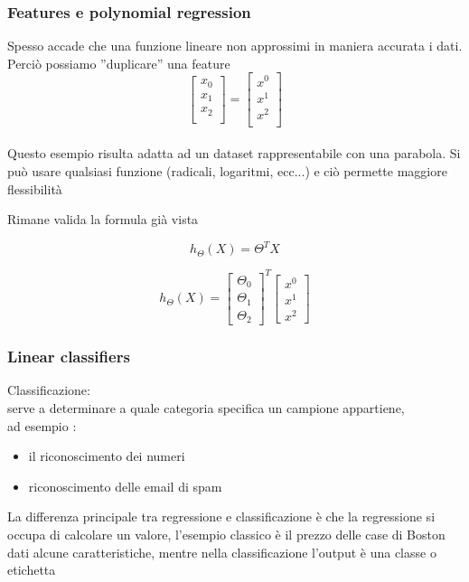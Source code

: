 \documentclass[10pt,oneside,a4paper]{article}
\begin{document}
\fi

\subsubsection{Features e polynomial regression}
Spesso accade che una funzione lineare non approssimi in maniera accurata i dati.
Perciò possiamo ''duplicare'' una feature \\
\[
\begin{bmatrix}
x_{0} \\
x_{1}  \\
x_{2} \\
\end{bmatrix}
=
\begin{bmatrix}
x^{0} \\
x^{1} \\
x^{2} \\
\end{bmatrix}
\] \\
Questo esempio risulta adatta ad un dataset rappresentabile con una parabola.
Si può usare qualsiasi funzione (radicali, logaritmi, ecc...) e ciò permette maggiore flessibilità

Rimane valida la formula già vista

$$h_{\Theta}(X)=\Theta^{T}X$$

\[
h_{\Theta}(X) = 
\begin{bmatrix}
\Theta_{0} \\
\Theta_{1} \\
\Theta_{2}
\end{bmatrix}^{\!T}
\begin{bmatrix}
x^{0} \\
x^{1} \\
x^{2}
\end{bmatrix}
\]
\subsubsection{Linear classifiers}
Classificazione: \\
serve a determinare a quale categoria specifica un campione appartiene, \\
ad esempio : 
\begin{itemize}
\item il riconoscimento dei numeri
\item riconoscimento delle email di spam

\end{itemize}

La differenza principale tra regressione e classificazione è che la regressione si occupa di calcolare un valore, l'esempio classico è il prezzo delle case di Boston dati alcune caratteristiche, mentre nella classificazione l'output è una classe o etichetta
\end{document}
